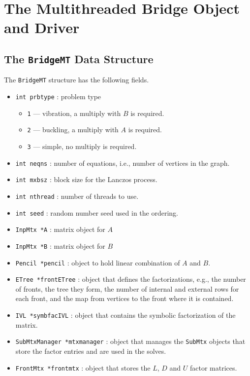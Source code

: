 \chapter{The Multithreaded Bridge Object and Driver}
\label{chapter:MT}
\par
\section{The \texttt{BridgeMT} Data Structure}
\label{section:BridgeMT:dataStructure}
\par
The {\tt BridgeMT} structure has the following fields.
\begin{itemize}
%
\item
{\tt int prbtype} : problem type
\begin{itemize}
\item {\tt 1} --- vibration, a multiply with $B$ is required.
\item {\tt 2} --- buckling, a multiply with $A$ is required.
\item {\tt 3} --- simple, no multiply is required.
\end{itemize}
\item
{\tt int neqns} : number of equations, 
i.e., number of vertices in the graph.
\item
{\tt int mxbsz} : block size for the Lanczos process.
\item
{\tt int nthread} : number of threads to use.
\item
{\tt int seed} : random number seed used in the ordering.
\item
{\tt InpMtx *A} : matrix object for $A$
\item
{\tt InpMtx *B} : matrix object for $B$
\item
{\tt Pencil *pencil} : object to hold linear combination of $A$ and $B$.
\item
{\tt ETree *frontETree} : object that defines the factorizations,
e.g., the number of fronts, the tree they form, the number of
internal and external rows for each front, and the map from
vertices to the front where it is contained.
\item
{\tt IVL *symbfacIVL} : object that contains the symbolic
factorization of the matrix.
\item
{\tt SubMtxManager *mtxmanager} : object that manages the
\texttt{SubMtx} objects that store the factor entries and are used
in the solves.
\item
{\tt FrontMtx *frontmtx} : object that stores the $L$, $D$ and $U$
factor matrices.

\end{itemize}

